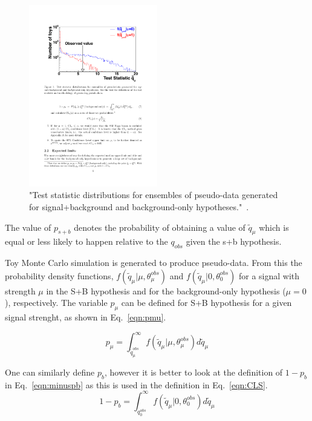 \begin{figure}[ht!]
\centering
    \includegraphics[width=0.5\textwidth]{images/Analysis/CLSdemo.pdf}
    \caption{"Test statistic distributions for ensembles of pseudo-data generated for signal+background and background-only hypotheses."~\cite{CMS-NOTE-2011-005}.}
    \label{fig:CLSdemo}
\end{figure}

The value of $p_{s+b}$ denotes the probability of obtaining a value of $\tilde{q}_{\mu}$ which is equal or less likely to happen relative to the $q_{obs}$ given the s+b hypothesis.

Toy Monte Carlo simulation is generated to produce pseudo-data. From this the probability density functions, $f\left(\tilde{q}_{\mu} | \mu, \theta^{obs}_{\mu}   \right)$ and $f\left(\tilde{q}_{\mu} |0, \theta^{obs}_{0}   \right) $ for a signal with strength $\mu$ in the S+B hypothesis and for the background-only hypothesis ($\mu=0$), respectively. The variable $p_{\mu}$ can be defined for S+B hypothesis for a given signal strenght, as shown in Eq.~\ref{eqn:pmu}.

\begin{equation}
p_{\mu} = \int_{\tilde{q}_{\mu}^{obs}}^{\infty} f\left(\tilde{q}_{\mu} | \mu, \theta^{obs}_{\mu}   \right) d\tilde{q}_{\mu}
\label{eqn:pmu}
\end{equation}

One can similarly define $p_{b}$, however it is better to look at the definition of $1-p_{b}$ in Eq.~\ref{eqn:minuspb} as this is used in the \CLS definition in Eq.~\ref{eqn:CLS}.
\begin{equation}
1-p_{b} = \int_{q_{0}^{obs}}^{\infty} f\left(\tilde{q}_{\mu} |0, \theta^{obs}_{0}   \right) d\tilde{q}_{\mu}
\label{eqn:minuspb}
\end{equation}


